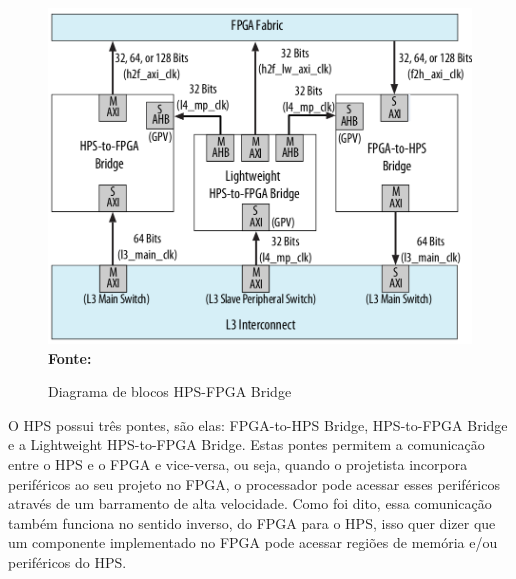 \begin{figure}[ht]
	\caption{Diagrama de blocos HPS-FPGA Bridge}
	\begin{center}
		\includegraphics[scale=0.35]{imagens/hps-fpga_bridge.png}\\
		{\small \textbf{Fonte:} }
    \end{center}\label{fig:hpsfpgabridge}
\end{figure}

O HPS possui três pontes, são elas: FPGA-to-HPS Bridge, HPS-to-FPGA Bridge e a Lightweight HPS-to-FPGA Bridge. Estas pontes permitem a comunicação entre o HPS e o FPGA e vice-versa, ou seja, quando o projetista incorpora periféricos ao seu projeto no FPGA, o processador pode acessar esses periféricos através de um barramento de alta velocidade. Como foi dito, essa comunicação também funciona no sentido inverso, do FPGA para o HPS, isso quer dizer que um componente implementado no FPGA pode acessar regiões de memória e/ou periféricos do HPS.






